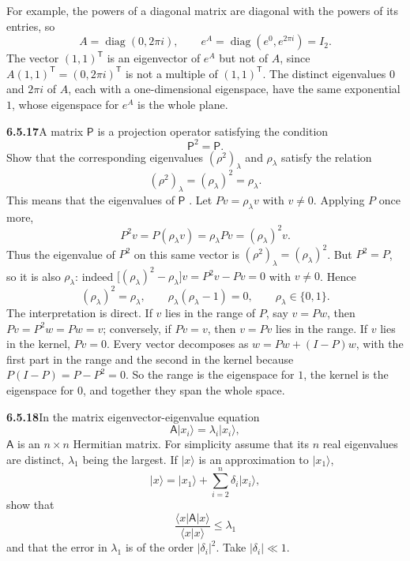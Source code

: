  For example, the powers of a
diagonal matrix are diagonal with the powers of its entries, so
\[
A=\operatorname{diag}(0,2\pi i),\qquad
e^A=\operatorname{diag}(e^0,e^{2\pi i})=I_2.
\]
The vector $(1,1)^{\mathsf T}$ is an eigenvector of $e^A$ but not of
$A$, since $A(1,1)^{\mathsf T}=(0,2\pi i)^{\mathsf T}$ is not a multiple
of $(1,1)^{\mathsf T}$. The distinct eigenvalues $0$ and $2\pi i$ of
$A$, each with a one-dimensional eigenspace, have the same exponential
$1$, whose eigenspace for $e^A$ is the whole plane.

\par\bigskip
\noindent\textbf{6.5.17}\quad A matrix $\mathsf{P}$ is a projection operator
satisfying the condition
\[
\mathsf{P}^{2}=\mathsf{P}.
\]
Show that the corresponding eigenvalues $(\rho^{2})_{\lambda}$ and
$\rho_{\lambda}$ satisfy the relation
\[
(\rho^{2})_{\lambda}=(\rho_{\lambda})^{2}=\rho_{\lambda}.
\]
This means that the eigenvalues of $\mathsf{P}$ .
\solution
Let $Pv=\rho_\lambda v$ with $v\ne0$. Applying $P$ once more,
\[
P^2v=P(\rho_\lambda v)=\rho_\lambda Pv
=(\rho_\lambda)^2v.
\]
Thus the eigenvalue of $P^2$ on this same vector is
$(\rho^2)_\lambda=(\rho_\lambda)^2$.
But $P^2=P$, so it is also $\rho_\lambda$: indeed
$\bigl[(\rho_\lambda)^2-\rho_\lambda\bigr]v=P^2v-Pv=0$ with $v\ne0$.
Hence
\[
(\rho_\lambda)^2=\rho_\lambda,
\qquad\rho_\lambda(\rho_\lambda-1)=0,
\qquad\boxed{\rho_\lambda\in\{0,1\}.}
\]
The interpretation is direct. If $v$ lies in the range of $P$, say
$v=Pw$, then $Pv=P^2w=Pw=v$; conversely, if $Pv=v$, then $v=Pv$ lies in
the range. If $v$ lies in the kernel, $Pv=0$.
Every vector decomposes as
$w=Pw+(I-P)w$, with the first part in the range and the second in the
kernel because $P(I-P)=P-P^2=0$. So the range is the eigenspace for
$1$, the kernel is the eigenspace for $0$, and together they span the
whole space.

\par\bigskip
\noindent\textbf{6.5.18}\quad In the matrix eigenvector-eigenvalue equation
\[
\mathsf{A}|x_{i}\rangle=\lambda_{i}|x_{i}\rangle,
\]
$\mathsf{A}$ is an $n\times n$ Hermitian matrix. For simplicity assume that
its $n$ real eigenvalues are distinct, $\lambda_{1}$ being the largest. If
$|x\rangle$ is an approximation to $|x_{1}\rangle$,
\[
|x\rangle=|x_{1}\rangle+\sum_{i=2}^{n}\delta_{i}|x_{i}\rangle,
\]
show that
\[
\frac{\langle x|\mathsf{A}|x\rangle}{\langle x|x\rangle}\le\lambda_{1}
\]
and that the error in $\lambda_{1}$ is of the order $|\delta_{i}|^{2}$. Take
$|\delta_{i}|\ll1$.

